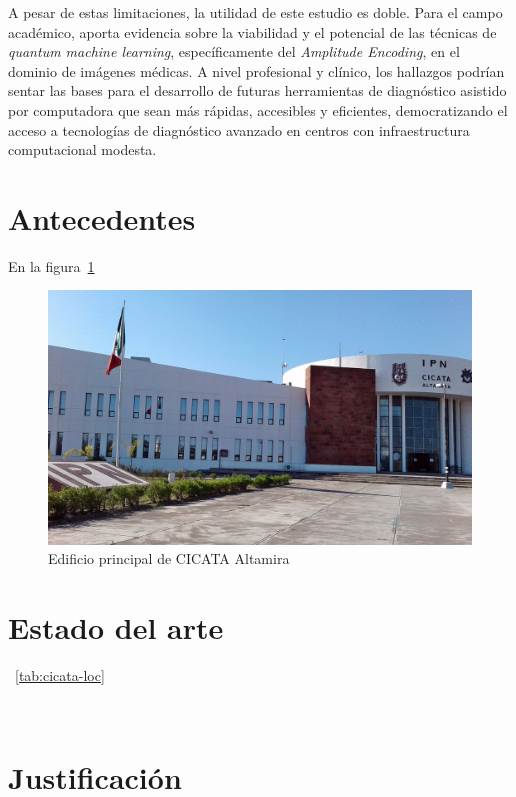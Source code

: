 A pesar de estas limitaciones, la utilidad de este estudio es doble. Para el campo académico, aporta evidencia sobre la viabilidad y el potencial de las técnicas de \textit{quantum machine learning}, específicamente del \textit{Amplitude Encoding}, en el dominio de imágenes médicas. A nivel profesional y clínico, los hallazgos podrían sentar las bases para el desarrollo de futuras herramientas de diagnóstico asistido por computadora que sean más rápidas, accesibles y eficientes, democratizando el acceso a tecnologías de diagnóstico avanzado en centros con infraestructura computacional modesta.



\section{Antecedentes} 
    En la figura~\ref{fig:cicata edificio}  \lipsum[1]
    \begin{figure}
       \centering
        \includegraphics[width=1\textwidth]{src/images/cicata-alt-building.jpeg}
        \caption{Edificio principal de CICATA Altamira}
        \label{fig:cicata edificio}
    \end{figure}    

\section{Estado del arte}
    \lipsum[1]~\ref{tab:cicata-loc}

    \lipsum[2]
    

    \cite{garcia2024exploration}~\lipsum[3]


\section{Justificación}
    \lipsum[1]

